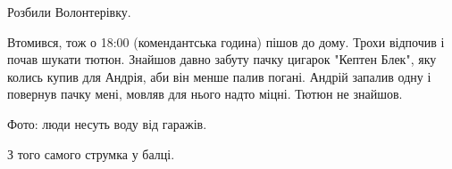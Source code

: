 Розбили Волонтерівку.

Втомився, тож о 18:00 (комендантська година) пішов до дому. Трохи відпочив і
почав шукати тютюн. Знайшов давно забуту пачку цигарок "Кептен Блек", яку
колись купив для Андрія, аби він менше палив погані. Андрій запалив одну і
повернув пачку мені, мовляв для нього надто міцні. Тютюн не знайшов.

Фото: люди несуть воду від гаражів.

З того самого струмка у балці.


